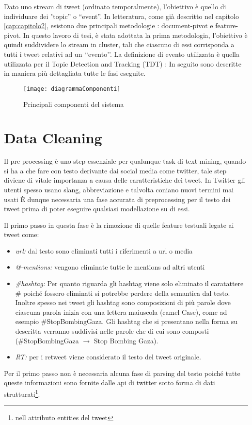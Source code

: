 

Dato uno stream  di tweet (ordinato temporalmente), l'obiettivo  è quello di individuare dei "topic” o “event”. In letteratura, come già descritto nel capitolo \ref{cap:capitolo2}, esistono due principali metodologie : document-pivot e feature-pivot.
In questo lavoro di tesi, è stata adottata la prima metodologia, l'obiettivo è quindi suddividere lo stream in cluster, tali che ciascuno di essi corrisponda a tutti i tweet relativi ad un \lq\lq evento\rq\rq.  
La definizione di evento utilizzata è quella utilizzata per il Topic Detection and Tracking (TDT) \cite{Allan:2002:TDT:772260} :
In seguito sono descritte in maniera più dettagliata tutte le fasi eseguite.
\begin{figure}[h]
    \centering
    \texttt{[image: diagrammaComponenti]}
    \caption{Principali componenti del sistema}
    \label{fig:diagrammaComponentiSistema}
\end{figure} 


\section{Data Cleaning}

Il pre-processing è uno step essenziale per qualunque task di text-mining, quando si ha a che fare con testo derivante dai social media come twitter, tale step diviene di vitale importanza a causa delle caratteristiche dei tweet. In Twitter gli utenti spesso usano slang, abbreviazione e talvolta coniano nuovi termini mai usati 
\`E dunque necessaria una fase accurata di preprocessing per il testo dei tweet prima di poter eseguire qualsiasi modellazione su di essi. 

Il primo passo in questa fase è la rimozione di quelle feature testuali legate ai tweet come:
\begin{itemize}
\item \emph{url:} dal testo sono eliminati tutti i riferimenti a url o media  
\item \emph{@-mentions:} vengono eliminate tutte le mentions ad altri utenti
\item  \emph{\#hashtag:} Per quanto riguarda gli hashtag viene solo eliminato il caratattere   \#   poiché fossero eliminati si potrebbe perdere della semantica dal testo.
Inoltre spesso nei tweet gli hashtag sono composizioni di più parole dove ciascuna parola inizia con una lettera maiuscola (camel Case), come ad esempio \#StopBombingGaza. Gli hashtag che si presentano nella forma su descritta verranno suddivisi nelle parole che di cui sono composti (\#StopBombingGaza $\rightarrow$ Stop Bombing Gaza).
\item \emph{RT:} per i retweet viene considerato il testo del tweet originale.
\end{itemize}
Per il primo passo non è necessaria alcuna fase di parsing del testo poiché tutte queste informazioni sono fornite dalle api di twitter sotto forma di dati strutturati\footnote{nell attributo entities del tweet}.

